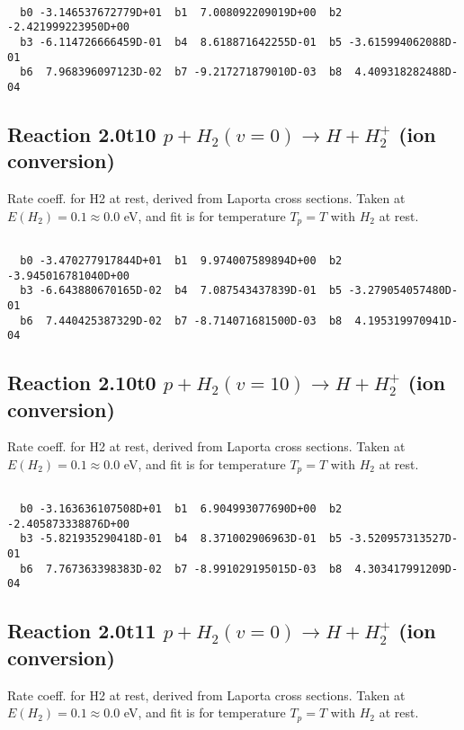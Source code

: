 \begin{small}\begin{verbatim}

  b0 -3.146537672779D+01  b1  7.008092209019D+00  b2 -2.421999223950D+00
  b3 -6.114726666459D-01  b4  8.618871642255D-01  b5 -3.615994062088D-01
  b6  7.968396097123D-02  b7 -9.217271879010D-03  b8  4.409318282488D-04

\end{verbatim}\end{small}

\newpage
\subsection{
Reaction 2.0t10
$ p + H_2(v=0) \rightarrow H + H_2^+$ (ion conversion)
}
Rate coeff. for H2 at rest, derived from Laporta cross sections.
Taken at $E(H_2) = 0.1 \approx 0.0$ eV,  and fit is for temperature $T_p=T$ with $H_2$ at rest.

\begin{small}\begin{verbatim}

  b0 -3.470277917844D+01  b1  9.974007589894D+00  b2 -3.945016781040D+00
  b3 -6.643880670165D-02  b4  7.087543437839D-01  b5 -3.279054057480D-01
  b6  7.440425387329D-02  b7 -8.714071681500D-03  b8  4.195319970941D-04

\end{verbatim}\end{small}

\newpage
\subsection{
Reaction 2.10t0
$ p + H_2(v=10) \rightarrow H + H_2^+$ (ion conversion)
}
Rate coeff. for H2 at rest, derived from Laporta cross sections.
Taken at $E(H_2) = 0.1 \approx 0.0$ eV,  and fit is for temperature $T_p=T$ with $H_2$ at rest.

\begin{small}\begin{verbatim}

  b0 -3.163636107508D+01  b1  6.904993077690D+00  b2 -2.405873338876D+00
  b3 -5.821935290418D-01  b4  8.371002906963D-01  b5 -3.520957313527D-01
  b6  7.767363398383D-02  b7 -8.991029195015D-03  b8  4.303417991209D-04

\end{verbatim}\end{small}

\newpage
\subsection{
Reaction 2.0t11
$ p + H_2(v=0) \rightarrow H + H_2^+$ (ion conversion)
}
Rate coeff. for H2 at rest, derived from Laporta cross sections.
Taken at $E(H_2) = 0.1 \approx 0.0$ eV,  and fit is for temperature $T_p=T$ with $H_2$ at rest.

